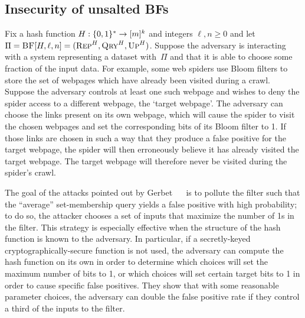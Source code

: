 \subsection{Insecurity of unsalted BFs}
Fix a hash function $H:\{0,1\}^*\to[m]^k$ and integers $\ell,n\geq0$ and let $\Pi
= \textnormal{\textsc{BF}}[H,\ell,n] = (\textnormal{\textsc{Rep}}^H, \textnormal{\textsc{Qry}}^H, \textnormal{\textsc{Up}}^H)$.
%
Suppose the adversary is interacting with a system representing a dataset
with~$\Pi$ and that it is able to choose some fraction of the input data.
For example, some web spiders use Bloom filters to store the set of webpages
which have already been visited during a crawl. Suppose the adversary controls
at least one such webpage and wishes to deny the spider access to a different
webpage, the `target webpage'. The adversary can choose the links present on its
own webpage, which will cause the spider to visit the chosen webpages and set
the corresponding bits of its Bloom filter to 1. If those links are chosen in
such a way that they produce a false positive for the target webpage, the spider
will then erroneously believe it has already visited the target webpage. The
target webpage will therefore never be visited during the spider's crawl.

%
The goal of the attacks pointed out by Gerbet \etal~~\cite{gerbet2015power} is
to pollute the filter such that the ``average'' set-membership query yields a
false positive with high probability; to do so, the attacker chooses a set of
inputs that maximize the number of 1s in the filter. This strategy is especially
effective when the structure of the hash function is known to the adversary. In
particular, if a secretly-keyed cryptographically-secure function is not used,
the adversary can compute the hash function on its own in order to determine
which choices will set the maximum number of bits to 1, or which choices will
set certain target bits to 1 in order to cause specific false positives. They
show that with some reasonable parameter choices, the adversary can double the
false positive rate if they control a third of the inputs to the filter.
%

